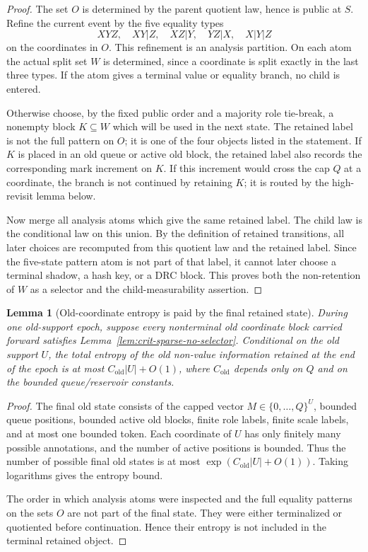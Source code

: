 \documentclass[11pt]{article}
\newtheorem{lemma}[theorem]{Lemma}
\theoremstyle{remark}
\newcommand{\old}{\mathrm{old}}
\begin{document}
\begin{proof}
The set $O$ is determined by the parent quotient law, hence is public at $S$.  Refine the current event by the five equality types
\[
XYZ,\quad XY|Z,\quad XZ|Y,\quad YZ|X,\quad X|Y|Z
\]
on the coordinates in $O$.  This refinement is an analysis partition.  On each atom the actual split set $W$ is determined, since a coordinate is split exactly in the last three types.  If the atom gives a terminal value or equality branch, no child is entered.

Otherwise choose, by the fixed public order and a majority role tie-break, a nonempty block $K\subseteq W$ which will be used in the next state.  The retained label is not the full pattern on $O$; it is one of the four objects listed in the statement.  If $K$ is placed in an old queue or active old block, the retained label also records the corresponding mark increment on $K$.  If this increment would cross the cap $Q$ at a coordinate, the branch is not continued by retaining $K$; it is routed by the high-revisit lemma below.

Now merge all analysis atoms which give the same retained label.  The child law is the conditional law on this union.  By the definition of retained transitions, all later choices are recomputed from this quotient law and the retained label.  Since the five-state pattern atom is not part of that label, it cannot later choose a terminal shadow, a hash key, or a DRC block.  This proves both the non-retention of $W$ as a selector and the child-measurability assertion.
\end{proof}

\begin{lemma}[Old-coordinate entropy is paid by the final retained state]\label{lem:crit-old-entropy}
During one old-support epoch, suppose every nonterminal old coordinate block carried forward satisfies Lemma~\ref{lem:crit-sparse-no-selector}.  Conditional on the old support $U$, the total entropy of the old non-value information retained at the end of the epoch is at most $C_{\old}|U|+O(1)$, where $C_{\old}$ depends only on $Q$ and on the bounded queue/reservoir constants.
\end{lemma}

\begin{proof}
The final old state consists of the capped vector $M\in\{0,\ldots,Q\}^{U}$, bounded queue positions, bounded active old blocks, finite role labels, finite scale labels, and at most one bounded token.  Each coordinate of $U$ has only finitely many possible annotations, and the number of active positions is bounded.  Thus the number of possible final old states is at most $\exp(C_{\old}|U|+O(1))$.  Taking logarithms gives the entropy bound.

The order in which analysis atoms were inspected and the full equality patterns on the sets $O$ are not part of the final state.  They were either terminalized or quotiented before continuation.  Hence their entropy is not included in the terminal retained object.
\end{proof}
\end{document}
